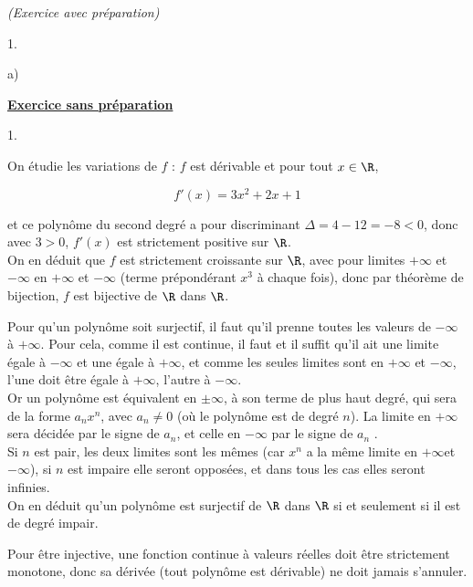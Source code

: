 \documentclass[11pt]{article}%
\begin{document}
\begin{exercice}{\it (Exercice avec préparation)}
\begin{noliste}{1.}
\begin{noliste}{a)}
 \end{noliste}

 \end{noliste}

 \noindent \textbf{\underline{Exercice sans préparation}} \\

 \begin{noliste}{1.}
 \setlength{\itemsep}{4mm}

 \item On étudie les variations de $f$ : $f$ est dérivable et pour tout
$x \in \R$,
 
\[
 f'(x) = 3 x^{2} + 2 x + 1 
\]

 et ce polynôme du second degré a pour discriminant $\Delta = 4 - 12 =
-8 < 0$, donc avec $3 > 0$, $f'(x)$ est strictement positive sur $\R$.
\\

 On en déduit que $f$ est strictement croissante sur $\R$, avec pour
limites $ + \infty$ et $-\infty$ en $ + \infty$ et $- \infty$ (terme
prépondérant $x^{3}$ à chaque fois), donc par théorème de bijection,
$f$ est bijective de $\R$ dans $\R$. \\

 \item Pour qu'un polynôme soit surjectif, il faut qu'il prenne toutes
les valeurs de $-\infty$ à $ + \infty$. Pour cela, comme il est
continue, il faut et il suffit qu'il ait une limite égale à $-\infty$
et une égale à $ + \infty$, et comme les seules limites sont en $ +
\infty$ et $-\infty$, l'une doit être égale à $ + \infty$, l'autre à
$-\infty$. \\

 Or un polynôme est équivalent en $\pm \infty$, à son terme de plus
haut degré, qui sera de la forme $a_{n} x^{n}$, avec $a_{n} \neq 0$ (où
le polynôme est de degré $n$). La limite en $ + \infty$ sera décidée
par le signe de $a_{n}$, et celle en $-\infty$ par le signe de $a_{n}$
. \\

 Si $n$ est pair, les deux limites sont les mêmes (car $x^{n}$ a la
même limite en $ + \infty$et $-\infty$), si $n$ est impaire elle seront
opposées, et dans tous les cas elles seront infinies. \\

 On en déduit qu'un polynôme est surjectif de $\R$ dans $\R$ si et
seulement si il est de degré impair. \\

 \item Pour être injective, une fonction continue à valeurs réelles
doit être strictement monotone, donc sa dérivée (tout polynôme est
dérivable) ne doit jamais s'annuler. \\


\end{noliste}
\end{exercice}
\end{document}
